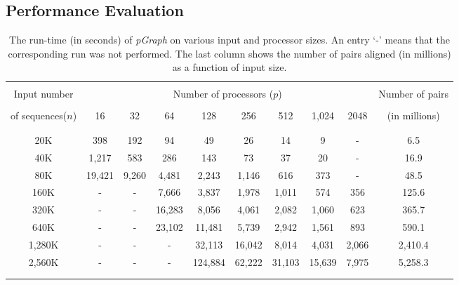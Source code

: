 \documentclass[10pt,journal,letterpaper,compsoc]{IEEEtran}
\def\colrule{\\[-7pt]\hline\\[-6pt]}
\begin{document}
\subsection{Performance Evaluation}

\begin{table}[thb]
\begin{center}
\begin{tabular}{ccccccccc||c}
\colrule
Input number & \multicolumn{8}{c||}{Number of processors ($p$)}& Number of pairs\\[2pt]  \cline{2-9} \\[-7pt]
\multicolumn{1}{c}{of sequences($n$)} & 16 & 32 & 64 & 128 & 256 & 512 & 1,024 & 2048 &  (in millions)\\
 \colrule
 20K & 398 & 192 & 94 & 49 & 26 & 14 & 9 & - & 6.5 \\
 40K & 1,217 & 583 & 286 & 143 & 73 & 37 &  20 & - & 16.9\\
 80K & 19,421  & 9,260  & 4,481 & 2,243 & 1,146 & 616 & 373 & - & 48.5\\
 160K & -  & - & 7,666 & 3,837 & 1,978  & 1,011  & 574 & 356 & 125.6\\
 320K & - & - &  16,283 & 8,056 & 4,061 & 2,082 & 1,060 & 623 & 365.7\\
 640K & - & - & 23,102 & 11,481 & 5,739  & 2,942  & 1,561 & 893 & 590.1 \\
 1,280K & - & - & - & 32,113 & 16,042  & 8,014  & 4,031 & 2,066 & 2,410.4 \\
 2,560K & - & - & - & 124,884 & 62,222  & 31,103  & 15,639 & 7,975 & 5,258.3\\
 \colrule
\end{tabular}
\end{center}
\caption{\label{tabRuntime}
The run-time (in seconds) of \emph{pGraph} on various input and processor sizes. An entry `-' means that the corresponding run was not performed. The last column shows the number of pairs aligned (in millions) as a function of input size.
}
\end{table}
\end{document}
